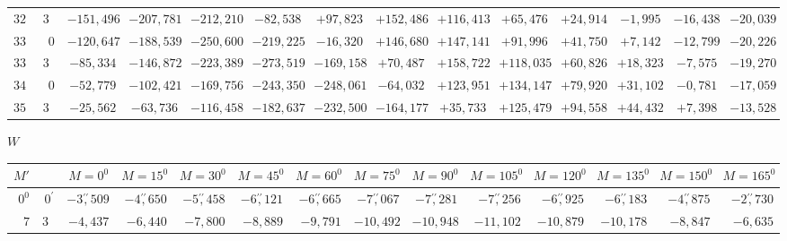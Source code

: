 \begin{landscape}
\begin{longtable}{@{}rr|r|r|r|r|r|r|r|r|r|r|r|r@{}}
\(322\) & \(30\) & \(-151{,}496\) & \(-207{,}781\) & \(-212{,}210\) & \(-82{,}538\) & \(+97{,}823\) & \(+152{,}486\) & \(+116{,}413\) & \(+65{,}476\) & \(+24{,}914\) & \(-1{,}995\) & \(-16{,}438\) & \(-20{,}039\)\\[2pt]
\(330\) & \(0\) & \(-120{,}647\) & \(-188{,}539\) & \(-250{,}600\) & \(-219{,}225\) & \(-16{,}320\) & \(+146{,}680\) & \(+147{,}141\) & \(+91{,}996\) & \(+41{,}750\) & \(+7{,}142\) & \(-12{,}799\) & \(-20{,}226\)\\
\(337\) & \(30\) & \(-85{,}334\) & \(-146{,}872\) & \(-223{,}389\) & \(-273{,}519\) & \(-169{,}158\) & \(+70{,}487\) & \(+158{,}722\) & \(+118{,}035\) & \(+60{,}826\) & \(+18{,}323\) & \(-7{,}575\) & \(-19{,}270\)\\
\(345\) & \(0\) & \(-52{,}779\) & \(-102{,}421\) & \(-169{,}756\) & \(-243{,}350\) & \(-248{,}061\) & \(-64{,}032\) & \(+123{,}951\) & \(+134{,}147\) & \(+79{,}920\) & \(+31{,}102\) & \(-0{,}781\) & \(-17{,}059\)\\
\(352\) & \(30\) & \(-25{,}562\) & \(-63{,}736\) & \(-116{,}458\) & \(-182{,}637\) & \(-232{,}500\) & \(-164{,}177\) & \(+35{,}733\) & \(+125{,}479\) & \(+94{,}558\) & \(+44{,}432\) & \(+7{,}398\) & \(-13{,}528\)\\
\end{longtable}
\clearpage
\endgroup
\clearpage
\begingroup
\fontsize{8.5}{10.5}\selectfont
{}
\renewcommand{\headrulewidth}{0pt}
\begin{center}\(W\)\end{center}
\setlength{\tabcolsep}{2.5pt}
\renewcommand{\arraystretch}{1.08}
\begin{longtable}{@{}rr|r|r|r|r|r|r|r|r|r|r|r|r@{}}
\hline
\(M'\) & & \(M=0^0\) & \(M=15^0\) & \(M=30^0\) & \(M=45^0\) & \(M=60^0\) & \(M=75^0\) & \(M=90^0\) & \(M=105^0\) & \(M=120^0\) & \(M=135^0\) & \(M=150^0\) & \(M=165^0\)\\
\hline
\endhead
\(0^0\) & \(0^\prime\) & \(-3\overset{\prime\prime}{,}509\) & \(-4\overset{\prime\prime}{,}650\) & \(-5\overset{\prime\prime}{,}458\) & \(-6\overset{\prime\prime}{,}121\) & \(-6\overset{\prime\prime}{,}665\) & \(-7\overset{\prime\prime}{,}067\) & \(-7\overset{\prime\prime}{,}281\) & \(-7\overset{\prime\prime}{,}256\) & \(-6\overset{\prime\prime}{,}925\) & \(-6\overset{\prime\prime}{,}183\) & \(-4\overset{\prime\prime}{,}875\) & \(-2\overset{\prime\prime}{,}730\)\\
\(7\) & \(30\) & \(-4{,}437\) & \(-6{,}440\) & \(-7{,}800\) & \(-8{,}889\) & \(-9{,}791\) & \(-10{,}492\) & \(-10{,}948\) & \(-11{,}102\) & \(-10{,}879\) & \(-10{,}178\) & \(-8{,}847\) & \(-6{,}635\)\\

\end{longtable}
\end{landscape}
